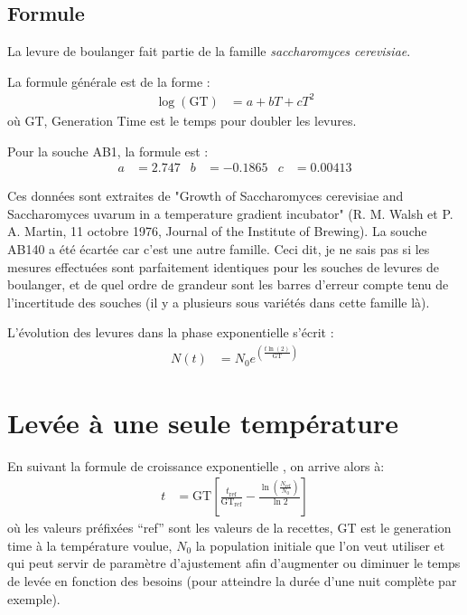 \documentclass[a4paper,twoside]{article}
\begin{document}
\subsection{Formule}\label{yeast_formulae}
La levure de boulanger fait partie de la famille \emph{saccharomyces cerevisiae}.

La formule générale est de la forme :
\begin{align}
\log(\mathrm{GT}) &= a + bT + cT^2
\end{align}
où GT, Generation Time est le temps pour doubler les levures.

Pour la souche AB1, la formule est :
\begin{align}
a&= 2.747 & b&= -0.1865 & c&= 0.00413
\end{align}

Ces données sont extraites de "Growth of Saccharomyces cerevisiae and Saccharomyces uvarum in a temperature gradient incubator" (R. M. Walsh et P. A. Martin, 11 octobre 1976, Journal of the Institute of Brewing). La souche AB140 a été écartée car c'est une autre famille. Ceci dit, je ne sais pas si les mesures effectuées sont parfaitement identiques pour les souches de levures de boulanger, et de quel ordre de grandeur sont les barres d'erreur compte tenu de l'incertitude des souches (il y a plusieurs sous variétés dans cette famille là).

L'évolution des levures dans la phase exponentielle s'écrit :
\begin{align}
N(t) &= N_0 e^{\left(\frac{t\ln(2)}{\mathrm{GT}}\right)}\label{exponential_growth}
\end{align}

\section{Levée à une seule température}
En suivant la formule de croissance exponentielle , on arrive alors à:
\begin{align}
t &= \mathrm{GT} \left[\frac{t_\text{ref}}{\mathrm{GT_\text{ref}}} - \frac{\ln\left(\frac{N_\text{ref}}{N_0}\right)}{\ln 2} \right]
\end{align}
où les valeurs préfixées ``ref'' sont les valeurs de la recettes, GT est le generation time à la température voulue, $N_0$ la population initiale que l'on veut utiliser et qui peut servir de paramètre d'ajustement afin d'augmenter ou diminuer le temps de levée en fonction des besoins (pour atteindre la durée d'une nuit complète par exemple).
\end{document}
